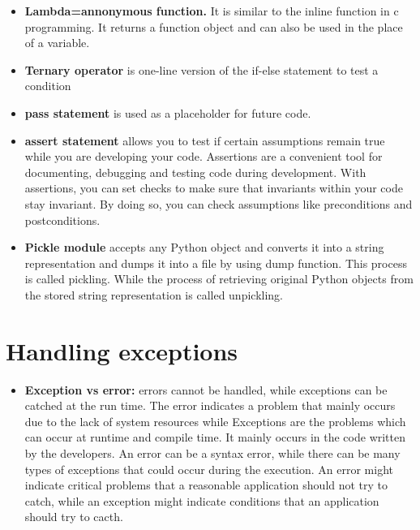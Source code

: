 \documentclass[
  letterpaper,
]{book}
\providecommand{\tightlist}{%
  \setlength{\itemsep}{0pt}\setlength{\parskip}{0pt}}\usepackage{longtable,booktabs,array}
\begin{document}
\begin{itemize}
\tightlist
\item
  \textbf{Lambda=annonymous function.} It is similar to the inline
  function in c programming. It returns a function object and can also
  be used in the place of a variable.
\item
  \textbf{Ternary operator} is one-line version of the if-else statement
  to test a condition
\item
  \textbf{pass statement} is used as a placeholder for future code.
\item
  \textbf{assert statement} allows you to test if certain assumptions
  remain true while you are developing your code. Assertions are a
  convenient tool for documenting, debugging and testing code during
  development. With assertions, you can set checks to make sure that
  invariants within your code stay invariant. By doing so, you can check
  assumptions like preconditions and postconditions.
\item
  \textbf{Pickle module} accepts any Python object and converts it into
  a string representation and dumps it into a file by using dump
  function. This process is called pickling. While the process of
  retrieving original Python objects from the stored string
  representation is called unpickling.
\end{itemize}

\hypertarget{handling-exceptions}{%
\section{Handling exceptions}\label{handling-exceptions}}

\begin{itemize}
\tightlist
\item
  \textbf{Exception vs error:} errors cannot be handled, while
  exceptions can be catched at the run time. The error indicates a
  problem that mainly occurs due to the lack of system resources while
  Exceptions are the problems which can occur at runtime and compile
  time. It mainly occurs in the code written by the developers. An error
  can be a syntax error, while there can be many types of exceptions
  that could occur during the execution. An error might indicate
  critical problems that a reasonable application should not try to
  catch, while an exception might indicate conditions that an
  application should try to cacth.
\end{itemize}
\end{document}
